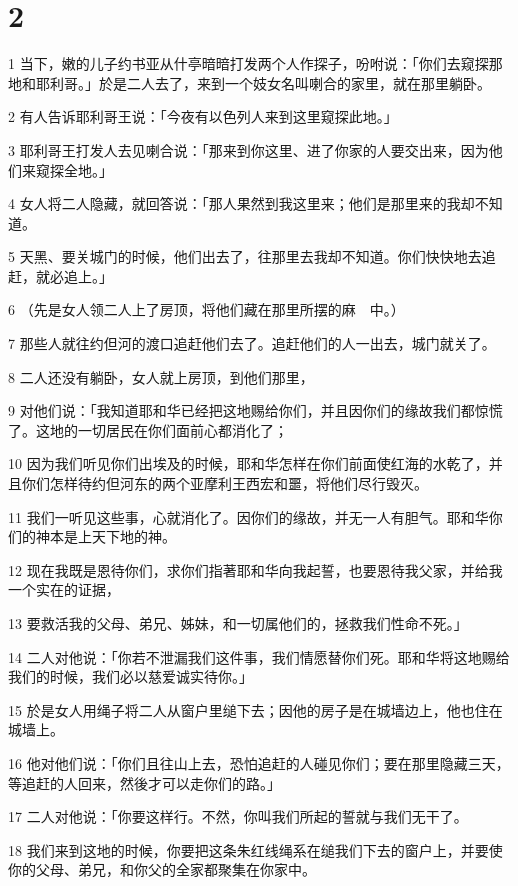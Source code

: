 \chapter{2}

\par 1 当下，嫩的儿子约书亚从什亭暗暗打发两个人作探子，吩咐说：「你们去窥探那地和耶利哥。」於是二人去了，来到一个妓女名叫喇合的家里，就在那里躺卧。
\par 2 有人告诉耶利哥王说：「今夜有以色列人来到这里窥探此地。」
\par 3 耶利哥王打发人去见喇合说：「那来到你这里、进了你家的人要交出来，因为他们来窥探全地。」
\par 4 女人将二人隐藏，就回答说：「那人果然到我这里来；他们是那里来的我却不知道。
\par 5 天黑、要关城门的时候，他们出去了，往那里去我却不知道。你们快快地去追赶，就必追上。」
\par 6 （先是女人领二人上了房顶，将他们藏在那里所摆的麻　中。）
\par 7 那些人就往约但河的渡口追赶他们去了。追赶他们的人一出去，城门就关了。
\par 8 二人还没有躺卧，女人就上房顶，到他们那里，
\par 9 对他们说：「我知道耶和华已经把这地赐给你们，并且因你们的缘故我们都惊慌了。这地的一切居民在你们面前心都消化了；
\par 10 因为我们听见你们出埃及的时候，耶和华怎样在你们前面使红海的水乾了，并且你们怎样待约但河东的两个亚摩利王西宏和噩，将他们尽行毁灭。
\par 11 我们一听见这些事，心就消化了。因你们的缘故，并无一人有胆气。耶和华你们的神本是上天下地的神。
\par 12 现在我既是恩待你们，求你们指著耶和华向我起誓，也要恩待我父家，并给我一个实在的证据，
\par 13 要救活我的父母、弟兄、姊妹，和一切属他们的，拯救我们性命不死。」
\par 14 二人对他说：「你若不泄漏我们这件事，我们情愿替你们死。耶和华将这地赐给我们的时候，我们必以慈爱诚实待你。」
\par 15 於是女人用绳子将二人从窗户里缒下去；因他的房子是在城墙边上，他也住在城墙上。
\par 16 他对他们说：「你们且往山上去，恐怕追赶的人碰见你们；要在那里隐藏三天，等追赶的人回来，然後才可以走你们的路。」
\par 17 二人对他说：「你要这样行。不然，你叫我们所起的誓就与我们无干了。
\par 18 我们来到这地的时候，你要把这条朱红线绳系在缒我们下去的窗户上，并要使你的父母、弟兄，和你父的全家都聚集在你家中。
